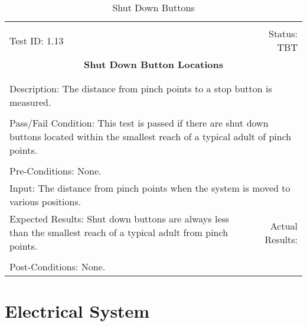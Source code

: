 \documentclass[titlepage]{article}
\begin{document}
\begin{center}%
\begin{table}
\begin{tabular}{|l r|}\hline&\\[-2mm]
	Test ID: 1.13	&Status: TBT\\[-3mm]
	\multicolumn{2}{|c|}{\textbf{\large{Shut Down Button Locations}}}\\&\\\hline&\\[-3mm]
	\multicolumn{2}{|p{\textwidth}|}{Description: The distance from pinch points to a stop button is measured.}\\[1mm]\hline&\\[-3mm]
	\multicolumn{2}{|p{\textwidth}|}{Pass/Fail Condition: This test is passed if there are shut down buttons located within the smallest reach of a typical adult of pinch points.}\\[1mm]\hline&\\[-3mm]
	\multicolumn{2}{|p{\textwidth}|}{Pre-Conditions: None.}\\[4mm]
	\multicolumn{2}{|p{\textwidth}|}{Input: The distance from pinch points when the system is moved to various positions.}\\[2mm]\hline
	\multicolumn{1}{|p{0.49\textwidth}}{Expected Results: Shut down buttons are always less than the smallest reach of a typical adult from pinch points.}	&\multicolumn{1}{|p{0.45\textwidth}|}{Actual Results:}\\\hline&\\[-3mm]
	\multicolumn{2}{|p{\textwidth}|}{Post-Conditions: None.}\\\hline
\end{tabular}
\caption{Shut Down Buttons}
\end{table}
\end{center}


\section{Electrical System}
\end{document}
